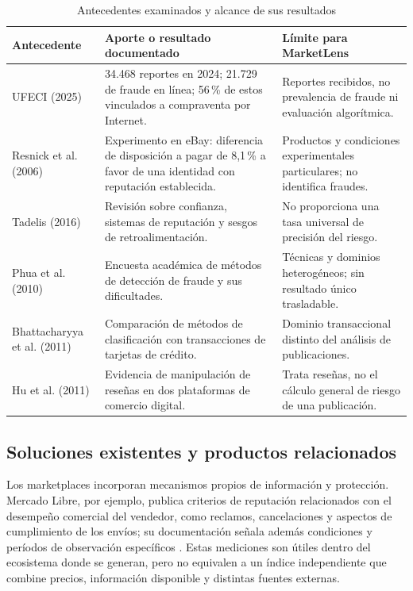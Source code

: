 \begin{table}[htbp]
    \centering
    \caption{Antecedentes examinados y alcance de sus resultados}
    \label{tab:ml-antecedentes-comparados}
    \footnotesize
    \begin{tabularx}{\textwidth}{@{}p{}X X@{}}
        \toprule
        \textbf{Antecedente} & \textbf{Aporte o resultado documentado} & \textbf{Límite para MarketLens} \\
        \midrule
        UFECI (2025) & 34.468 reportes en 2024; 21.729 de fraude en línea; 56\,\% de estos vinculados a compraventa por Internet. & Reportes recibidos, no prevalencia de fraude ni evaluación algorítmica. \\
        \addlinespace[2pt]
        Resnick et al. (2006) & Experimento en eBay: diferencia de disposición a pagar de 8,1\,\% a favor de una identidad con reputación establecida. & Productos y condiciones experimentales particulares; no identifica fraudes. \\
        \addlinespace[2pt]
        Tadelis (2016) & Revisión sobre confianza, sistemas de reputación y sesgos de retroalimentación. & No proporciona una tasa universal de precisión del riesgo. \\
        \addlinespace[2pt]
        Phua et al. (2010) & Encuesta académica de métodos de detección de fraude y sus dificultades. & Técnicas y dominios heterogéneos; sin resultado único trasladable. \\
        \addlinespace[2pt]
        Bhattacharyya et al. (2011) & Comparación de métodos de clasificación con transacciones de tarjetas de crédito. & Dominio transaccional distinto del análisis de publicaciones. \\
        \addlinespace[2pt]
        Hu et al. (2011) & Evidencia de manipulación de reseñas en dos plataformas de comercio digital. & Trata reseñas, no el cálculo general de riesgo de una publicación. \\
        \bottomrule
    \end{tabularx}
\end{table}

\subsection{Soluciones existentes y productos relacionados}\label{subsec:ml-soluciones-existentes}

Los marketplaces incorporan mecanismos propios de información y protección. Mercado Libre, por ejemplo, publica criterios de reputación relacionados con el desempeño comercial del vendedor, como reclamos, cancelaciones y aspectos de cumplimiento de los envíos; su documentación señala además condiciones y períodos de observación específicos \parencite{ml-meli-reputacion}. Estas mediciones son útiles dentro del ecosistema donde se generan, pero no equivalen a un índice independiente que combine precios, información disponible y distintas fuentes externas.


